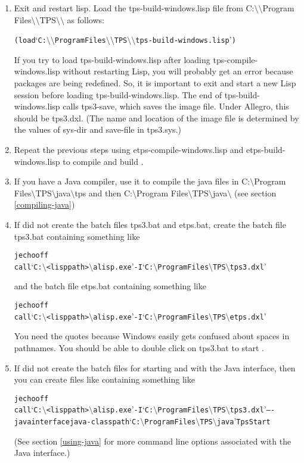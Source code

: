 \begin{enumerate}
\item Exit and restart lisp.  Load the tps-build-windows.lisp
file from C:\(\setminus\setminus\)Program Files\(\setminus\setminus\)TPS\(\setminus\setminus\) as follows:
\begin{alltt}
(load `C:\(\setminus\setminus\)Program Files\(\setminus\setminus\)TPS\(\setminus\setminus\)tps-build-windows.lisp')
\end{alltt}
If you try to load tps-build-windows.lisp after loading
tps-compile-windows.lisp without restarting Lisp, you will probably
get an error because packages are being redefined.  So, it
is important to exit and start a new Lisp session before
loading tps-build-windows.lisp.
The end of tps-build-windows.lisp calls tps3-save, which
saves the image file.  Under Allegro, this should be tps3.dxl.
(The name and location of the image file is determined by
the values of sys-dir and save-file in tps3.sys.)

\item Repeat the previous steps using etps-compile-windows.lisp and etps-build-windows.lisp
to compile and build {\ETPS}.

\item If you have a Java compiler, use it to compile the java files in
C:\(\setminus\)Program Files\(\setminus\)TPS\(\setminus\)java\(\setminus\)tps
and then
C:\(\setminus\)Program Files\(\setminus\)TPS\(\setminus\)java\(\setminus\)
(see section \ref{compiling-java})

\item If  did not create the batch files
tps3.bat and etps.bat,
create the batch file tps3.bat containing something like
\begin{alltt}
jecho off
call `C:\(\setminus\)<lisppath>\(\setminus\)alisp.exe' -I `C:\(\setminus\)Program Files\(\setminus\)TPS\(\setminus\)tps3.dxl'
\end{alltt}
and the batch file etps.bat containing something like
\begin{alltt}
jecho off
call `C:\(\setminus\)<lisppath>\(\setminus\)alisp.exe' -I `C:\(\setminus\)Program Files\(\setminus\)TPS\(\setminus\)etps.dxl'
\end{alltt}
You need the quotes because Windows easily gets confused about spaces
in pathnames.  You should be able to double click on tps3.bat to
start {\TPS}.

\item If  did not create the batch files
for starting {\TPS} and {\ETPS} with the Java interface, then you
can create files like  containing something like
\begin{alltt}
jecho off
call `C:\(\setminus\)<lisppath>\(\setminus\)alisp.exe' -I `C:\(\setminus\)Program Files\(\setminus\)TPS\(\setminus\)tps3.dxl' -- -javainterface java -classpath `C:\(\setminus\)Program Files\(\setminus\)TPS\(\setminus\)java' TpsStart
\end{alltt}
(See section \ref{using-java} for more command line options associated with the Java interface.)

\end{enumerate}

